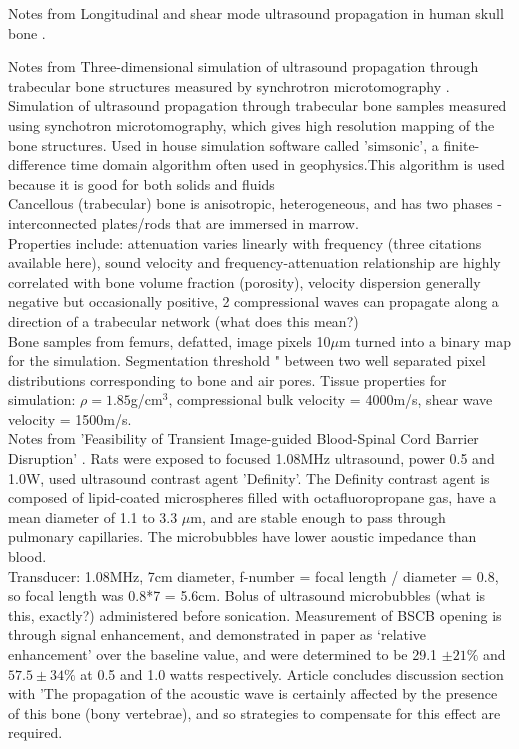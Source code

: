 \documentclass[11pt,titlepage]{article} %
\begin{document}
Notes from Longitudinal and shear mode ultrasound propagation in human skull bone \cite{white2006longitudinal}.


Notes from Three-dimensional simulation of ultrasound propagation through trabecular bone structures measured by synchrotron microtomography \cite{bossy2005three}.
Simulation of ultrasound propagation through trabecular bone samples measured using synchotron microtomography, which gives high resolution mapping of the bone structures.
Used in house simulation software called 'simsonic', a finite-difference time domain algorithm often used in geophysics.This algorithm is used because it is good for both solids and fluids \cite{graves1996simulating}\\
Cancellous (trabecular) bone is anisotropic, heterogeneous, and has two phases - interconnected plates/rods that are immersed in marrow. \\
Properties include: attenuation varies linearly with frequency (three citations available here), sound velocity and frequency-attenuation relationship are highly correlated with bone volume fraction (porosity), velocity dispersion generally negative but occasionally positive, 2 compressional waves can propagate along a direction of a trabecular network (what does this mean?)\\
Bone samples from femurs, defatted, image pixels 10$\mu$m turned into a binary map for the simulation. Segmentation threshold " between two well separated pixel distributions corresponding to bone and air pores. Tissue properties for simulation: $\rho = 1.85$g/cm$^3$, compressional bulk velocity = 4000m/s, shear wave velocity = 1500m/s.\\

Notes from 'Feasibility of Transient Image-guided Blood-Spinal Cord Barrier Disruption' \cite{wachsmuth2009feasibility}.
Rats were exposed to focused 1.08MHz ultrasound, power 0.5 and 1.0W, used ultrasound contrast agent 'Definity'. The Definity contrast agent is composed of lipid-coated microspheres filled with octafluoropropane gas, have a mean diameter of 1.1 to 3.3 $\mu$m, and are stable enough to pass through pulmonary capillaries. The microbubbles have lower aoustic impedance than blood. \\
Transducer: 1.08MHz, 7cm diameter, f-number = focal length / diameter = 0.8, so focal length was 0.8*7 = 5.6cm. Bolus of ultrasound microbubbles (what is this, exactly?) administered before sonication. Measurement of BSCB opening is through signal enhancement, and demonstrated in paper as `relative enhancement' over the baseline value, and were determined to be 29.1 $\pm 21\%$ and $57.5 \pm 34\%$ at 0.5 and 1.0 watts respectively. Article concludes discussion section with 'The propagation of the acoustic wave is certainly affected by the presence of this bone (bony vertebrae), and so strategies to compensate for this effect are required.\\
\end{document}
